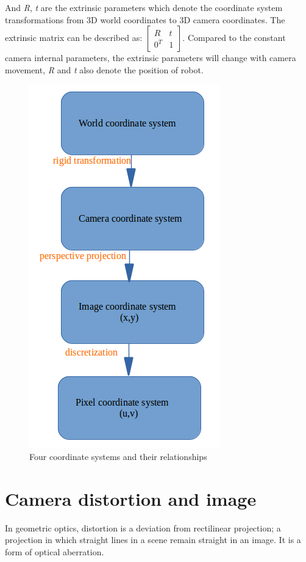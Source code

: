 And \textit{R}, \textit{t} are the extrinsic parameters which denote the coordinate system transformations from 3D world coordinates to 3D camera coordinates. The extrinsic matrix can be described as:
$ \begin{bmatrix} R & t\\
                0^T & 1 \end{bmatrix}                  
$. Compared to the constant camera internal parameters, the extrinsic parameters will change with camera movement, \textit{R} and \textit{t} also denote the position of robot.

\begin{figure}[h]
\centering
\includegraphics[scale=0.5]{./fig/4process.png}
\caption{Four coordinate systems and their relationships}
\label{fig:4process}
\end{figure}

\section{Camera distortion and image}
In geometric optics, distortion is a deviation from rectilinear projection; a projection in which straight lines in a scene remain straight in an image. It is a form of optical aberration\cite{wiki_do}.

